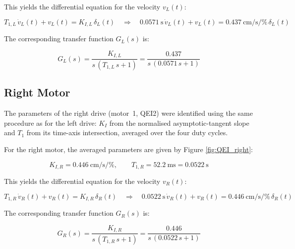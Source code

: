 \documentclass[12pt, oneside, a4paper]{scrreprt}
\begin{document}
            This yields the differential equation for the velocity $v_L(t)$:

            \begin{equation}
                T_{1,L}\,\dot{v}_L(t) + v_L(t) = K_{I,L}\,\delta_L(t)
                \quad\Rightarrow\quad
                \qty{0.0571}{\second}\,\dot{v}_L(t) + v_L(t) = \qty{0.437}{\centi\metre\per\second\per\percent}\,\delta_L(t)
            \end{equation}

            The corresponding transfer function $G_L(s)$ is:

            \begin{equation}
                G_L(s) = \frac{K_{I,L}}{s\,(T_{1,L}\,s + 1)} = \frac{0.437}{s\,(0.0571\,s + 1)}
            \end{equation}


            \subsection{Right Motor}\label{subsec:right-motor}

            The parameters of the right drive (motor~1, QEI2) were identified using the same procedure as for the left drive: $K_I$ from the normalised asymptotic-tangent slope and $T_1$ from its time-axis intersection, averaged over the four duty cycles.

            For the right motor, the averaged parameters are given by Figure \ref{fig:QEI_right}:

            \begin{equation}
                K_{I,R} = \qty{0.446}{\centi\metre\per\second\per\percent}, \qquad
                T_{1,R} = \qty{52.2}{\milli\second} = \qty{0.0522}{\second}
            \end{equation}

            This yields the differential equation for the velocity $v_R(t)$:

            \begin{equation}
                T_{1,R}\,\dot{v}_R(t) + v_R(t) = K_{I,R}\,\delta_R(t)
                \quad\Rightarrow\quad
                \qty{0.0522}{\second}\,\dot{v}_R(t) + v_R(t) = \qty{0.446}{\centi\metre\per\second\per\percent}\,\delta_R(t)
            \end{equation}

            The corresponding transfer function $G_R(s)$ is:

            \begin{equation}
                G_R(s) = \frac{K_{I,R}}{s\,(T_{1,R}\,s + 1)} = \frac{0.446}{s\,(0.0522\,s + 1)}
            \end{equation}
\end{document}
